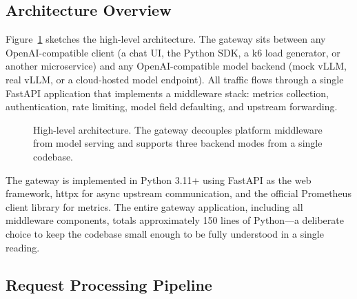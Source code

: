 \documentclass[10pt,journal]{IEEEtran}
\begin{document}
\subsection{Architecture Overview}

Figure~\ref{fig:arch} sketches the high-level architecture. The gateway sits between any OpenAI-compatible client (a chat UI, the Python SDK, a k6 load generator, or another microservice) and any OpenAI-compatible model backend (mock vLLM, real vLLM, or a cloud-hosted model endpoint). All traffic flows through a single FastAPI application that implements a middleware stack: metrics collection, authentication, rate limiting, model field defaulting, and upstream forwarding.

\begin{figure}[t]
\centering
{}
\caption{High-level architecture. The gateway decouples platform middleware from model serving and supports three backend modes from a single codebase.}
\label{fig:arch}
\end{figure}

The gateway is implemented in Python 3.11+ using FastAPI as the web framework, httpx for async upstream communication, and the official Prometheus client library for metrics. The entire gateway application, including all middleware components, totals approximately 150 lines of Python---a deliberate choice to keep the codebase small enough to be fully understood in a single reading.

\subsection{Request Processing Pipeline}
\end{document}

